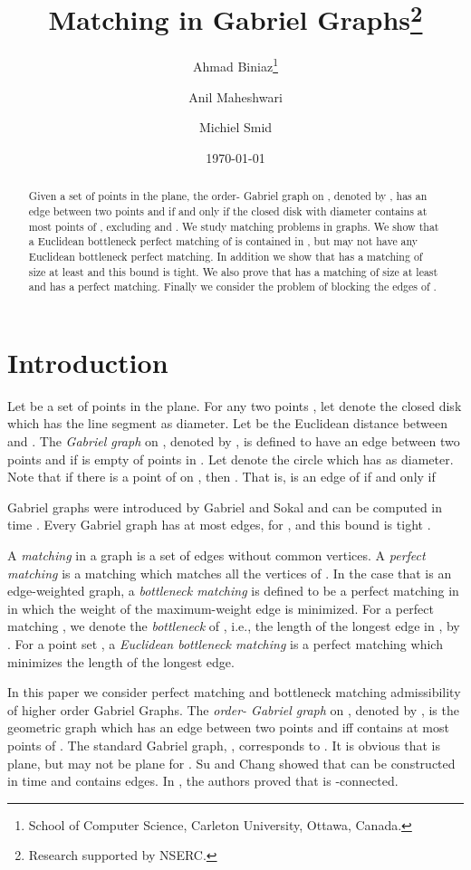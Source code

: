 \documentclass[11pt,a4paper]{article}
\title{Matching in Gabriel Graphs\thanks{Research supported by NSERC.}}
\author{
Ahmad Biniaz\thanks{School of Computer Science, Carleton University, 
                    Ottawa, Canada.}
\and 
Anil Maheshwari\footnotemark[2]
\and 
Michiel Smid\footnotemark[2]
}
\date{\today}
\newcommand{\kGG}[2]{}
\begin{document}
\maketitle

\begin{abstract}
Given a set  of  points in the plane, the order- Gabriel graph on , denoted by \kGG{k}{}, has an edge between two points  and  if and only if the closed disk with diameter  contains at most  points of , excluding  and . We study matching problems in \kGG{k}{} graphs. We show that a Euclidean bottleneck perfect matching of  is contained in \kGG{10}{}, but \kGG{8}{} may not have any Euclidean bottleneck perfect matching. In addition we show that \kGG{0}{} has a matching of size at least  and this bound is tight. We also prove that \kGG{1}{} has a matching of size at least  and \kGG{2}{} has a perfect matching. Finally we consider the problem of blocking the edges of \kGG{k}{}.
\end{abstract}

\section{Introduction}
Let  be a set of  points in the plane. For any two points , let  denote the closed disk which has the line segment  as diameter. Let  be the Euclidean distance between  and .
The {\em Gabriel graph} on , denoted by , is defined to have an edge between two points  and  if  is empty of points in . Let  denote the circle which has  as diameter. Note that if there is a point of  on , then . That is,  is an edge of  if and only if 

Gabriel graphs were introduced by Gabriel and Sokal \cite{Gabriel1969} and can be computed in  time \cite{Matula1980}. Every Gabriel graph has at most  edges, for , and this bound is tight \cite{Matula1980}. 

A {\em matching} in a graph  is a set of edges without common vertices. A {\em perfect matching} is a matching which matches all the vertices of . 
In the case that  is an edge-weighted graph, a {\em bottleneck matching} is defined to be a perfect matching in  in which the weight of the maximum-weight edge is minimized. For a perfect matching , we denote the {\em bottleneck} of , i.e., the length of the longest edge in , by . For a point set , a {\em Euclidean bottleneck matching} is a perfect matching which minimizes the length of the longest edge. 

In this paper we consider perfect matching and bottleneck matching admissibility of higher order Gabriel Graphs. The {\em order- Gabriel graph} on , denoted by \kGG{k}{}, is the geometric graph which has an edge between two points  and  iff  contains at most  points of . The standard Gabriel graph, , corresponds to \kGG{0}{}. It is obvious that \kGG{0}{} is plane, but \kGG{k}{} may not be plane for . Su and Chang \cite{Su1990} showed that \kGG{k}{} can be constructed in  time and contains  edges. In \cite{Bose2013}, the authors proved that \kGG{k}{} is -connected.
\end{document}
